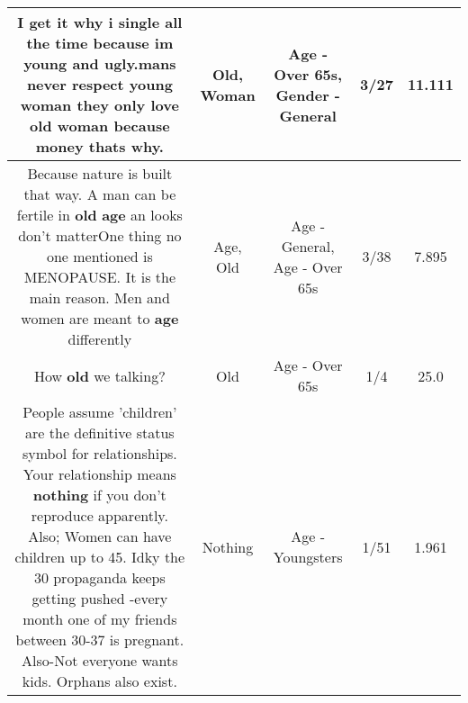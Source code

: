 \documentclass[11pt]{article}
\newlength\mylength
\begin{document}
\begin{center}
\begin{longtable}{|C{.65\mylength}|C{.30\mylength}|C{.12\mylength}|C{.12\mylength}|C{.12\mylength}|}
  \small I get it why i single all the time because im young and ugly.mans never respect young \textbf{woman} they only love \textbf{old} \textbf{woman} because money thats why.\normalsize   & Old, Woman & Age - Over 65s, Gender - General & 3/27 & 11.111 \\  \hline
  \small Because nature is built  that way. A man can be fertile in \textbf{old} \textbf{age} an looks don't matterOne thing no one mentioned  is MENOPAUSE. It is the main reason. Men and women are meant to \textbf{age} differently\normalsize   & Age, Old & Age - General, Age - Over 65s & 3/38 & 7.895 \\  \hline
  \small How \textbf{old} we talking?\normalsize   & Old & Age - Over 65s & 1/4 & 25.0 \\  \hline
  \small People assume 'children' are the definitive status symbol for relationships. Your relationship means \textbf{nothing} if you don't reproduce apparently. Also; Women can have children up to 45. Idky the 30 propaganda keeps getting pushed -every month one of my friends between 30-37 is pregnant. Also-Not everyone wants kids. Orphans also exist.\normalsize   & Nothing & Age - Youngsters & 1/51 & 1.961 \\  \hline

\end{longtable}
\end{center}
\end{document}
